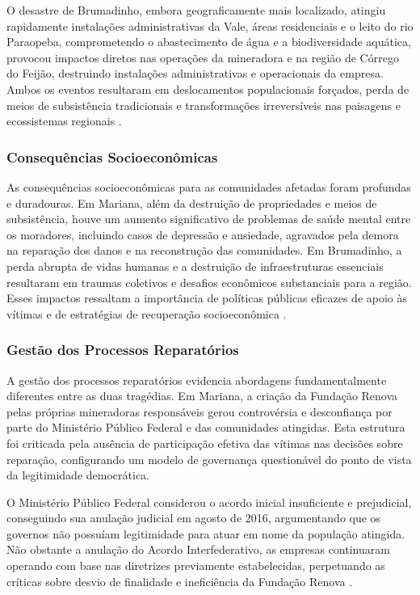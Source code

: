 O desastre de Brumadinho, embora geograficamente mais localizado, atingiu rapidamente instalações administrativas da Vale, áreas residenciais e o leito do rio Paraopeba, comprometendo o abastecimento de água e a biodiversidade aquática, provocou impactos diretos nas operações da mineradora e na região de Córrego do Feijão, destruindo instalações administrativas e operacionais da empresa. Ambos os eventos resultaram em deslocamentos populacionais forçados, perda de meios de subsistência tradicionais e transformações irreversíveis nas paisagens e ecossistemas regionais \cite{wikipedia2019brumadinho, congressofoco2025}.

\subsubsection{Consequências Socioeconômicas}

As consequências socioeconômicas para as comunidades afetadas foram profundas e duradouras. Em Mariana, além da destruição de propriedades e meios de subsistência, houve um aumento significativo de problemas de saúde mental entre os moradores, incluindo casos de depressão e ansiedade, agravados pela demora na reparação dos danos e na reconstrução das comunidades. Em Brumadinho, a perda abrupta de vidas humanas e a destruição de infraestruturas essenciais resultaram em traumas coletivos e desafios econômicos substanciais para a região. Esses impactos ressaltam a importância de políticas públicas eficazes de apoio às vítimas e de estratégias de recuperação socioeconômica \cite{estadominas2024alerta}.

\subsubsection{Gestão dos Processos Reparatórios}

A gestão dos processos reparatórios evidencia abordagens fundamentalmente diferentes entre as duas tragédias. Em Mariana, a criação da Fundação Renova pelas próprias mineradoras responsáveis gerou controvérsia e desconfiança por parte do Ministério Público Federal e das comunidades atingidas. Esta estrutura foi criticada pela ausência de participação efetiva das vítimas nas decisões sobre reparação, configurando um modelo de governança questionável do ponto de vista da legitimidade democrática.

O Ministério Público Federal considerou o acordo inicial insuficiente e prejudicial, conseguindo sua anulação judicial em agosto de 2016, argumentando que os governos não possuíam legitimidade para atuar em nome da população atingida. Não obstante a anulação do Acordo Interfederativo, as empresas continuaram operando com base nas diretrizes previamente estabelecidas, perpetuando as críticas sobre desvio de finalidade e ineficiência da Fundação Renova \cite{greenpeace2016valor}.

